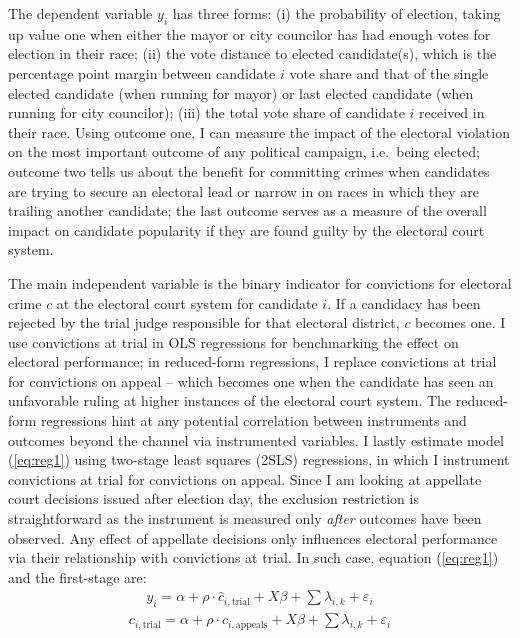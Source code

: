 \documentclass[11pt]{article}
\newcommand{\refp}[1]{(\ref{#1})}
\begin{document}
The dependent variable $y_{i}$ has three forms: (i) the probability of election, taking up value one when either the mayor or city councilor has had enough votes for election in their race; (ii) the vote distance to elected candidate(s), which is the percentage point margin between candidate $i$ vote share and that of the single elected candidate (when running for mayor) or last elected candidate (when running for city councilor); (iii) the total vote share of candidate $i$ received in their race. Using outcome one, I can measure the impact of the electoral violation on the most important outcome of any political campaign, i.e.~being elected; outcome two tells us about the benefit for committing crimes when candidates are trying to secure an electoral lead or narrow in on races in which they are trailing another candidate; the last outcome serves as a measure of the overall impact on candidate popularity if they are found guilty by the electoral court system.

The main independent variable is the binary indicator for convictions for electoral crime $c$ at the electoral court system for candidate $i$. If a candidacy has been rejected by the trial judge responsible for that electoral district, $c$ becomes one. I use convictions at trial in OLS regressions for benchmarking the effect on electoral performance; in reduced-form regressions, I replace convictions at trial for convictions on appeal -- which becomes one when the candidate has seen an unfavorable ruling at higher instances of the electoral court system. The reduced-form regressions hint at any potential correlation between instruments and outcomes beyond the channel via instrumented variables. I lastly estimate model \refp{eq:reg1} using two-stage least squares (2SLS) regressions, in which I instrument convictions at trial for convictions on appeal. Since I am looking at appellate court decisions issued after election day, the exclusion restriction is straightforward as the instrument is measured only \emph{after} outcomes have been observed. Any effect of appellate decisions only influences electoral performance via their relationship with convictions at trial. In such case, equation \refp{eq:reg1} and the first-stage are:
\begin{equation} \label{eq:reg2}
  \begin{split}
    y_{i} = \alpha + \rho \cdot \hat{c}_{i, \text{trial}} + X\beta + \sum \lambda_{i, k} + \varepsilon_{i}
  \end{split}
\end{equation}
\begin{equation} \label{eq:regfirststage}
  \begin{split}
    c_{i, \text{trial}} = \alpha + \rho \cdot c_{i, \text{appeals}} + X\beta + \sum \lambda_{i, k} + \varepsilon_{i}
  \end{split}
\end{equation}
\end{document}
